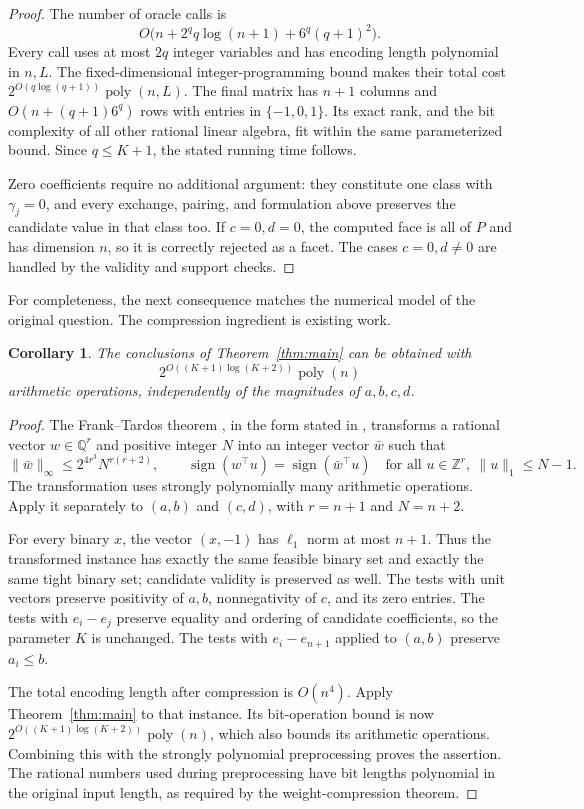 \documentclass[11pt]{article}
\newtheorem{corollary}[theorem]{Corollary}
\newcommand{\Z}{\mathbb Z}\newcommand{\R}{\mathbb R}
\begin{document}
\begin{proof}
The number of oracle calls is
\[
 O\bigl(n+2^q q\log(n+1)+6^q(q+1)^2\bigr).
\]
Every call uses at most $2q$ integer variables and has encoding length polynomial in $n,L$. The fixed-dimensional integer-programming bound makes their total cost $2^{O(q\log(q+1))}\operatorname{poly}(n,L)$. The final matrix has $n+1$ columns and $O(n+(q+1)6^q)$ rows with entries in $\{-1,0,1\}$. Its exact rank, and the bit complexity of all other rational linear algebra, fit within the same parameterized bound. Since $q\le K+1$, the stated running time follows.

Zero coefficients require no additional argument: they constitute one class with $\gamma_j=0$, and every exchange, pairing, and formulation above preserves the candidate value in that class too. If $c=0,d=0$, the computed face is all of $P$ and has dimension $n$, so it is correctly rejected as a facet. The cases $c=0,d\ne0$ are handled by the validity and support checks.
\end{proof}

For completeness, the next consequence matches the numerical model of the original question. The compression ingredient is existing work.
\begin{corollary}\label{cor:compression}
The conclusions of Theorem~\ref{thm:main} can be obtained with
\[
 2^{O((K+1)\log(K+2))}\operatorname{poly}(n)
\]
arithmetic operations, independently of the magnitudes of $a,b,c,d$.
\end{corollary}
\begin{proof}
The Frank--Tardos theorem \cite{FT}, in the form stated in \cite[Theorem 1]{EKMR}, transforms a rational vector $w\in\mathbb Q^r$ and positive integer $N$ into an integer vector $\bar w$ such that
\[
 \|\bar w\|_\infty\le 2^{4r^3}N^{r(r+2)},\qquad
 \operatorname{sign}(w^\top u)=\operatorname{sign}(\bar w^\top u)
 \quad\text{for all }u\in\Z^r,\ \|u\|_1\le N-1.
\]
The transformation uses strongly polynomially many arithmetic operations. Apply it separately to $(a,b)$ and $(c,d)$, with $r=n+1$ and $N=n+2$.

For every binary $x$, the vector $(x,-1)$ has $\ell_1$ norm at most $n+1$. Thus the transformed instance has exactly the same feasible binary set and exactly the same tight binary set; candidate validity is preserved as well. The tests with unit vectors preserve positivity of $a,b$, nonnegativity of $c$, and its zero entries. The tests with $e_i-e_j$ preserve equality and ordering of candidate coefficients, so the parameter $K$ is unchanged. The tests with $e_i-e_{n+1}$ applied to $(a,b)$ preserve $a_i\le b$.

The total encoding length after compression is $O(n^4)$. Apply Theorem~\ref{thm:main} to that instance. Its bit-operation bound is now $2^{O((K+1)\log(K+2))}\operatorname{poly}(n)$, which also bounds its arithmetic operations. Combining this with the strongly polynomial preprocessing proves the assertion. The rational numbers used during preprocessing have bit lengths polynomial in the original input length, as required by the weight-compression theorem.
\end{proof}
\end{document}
